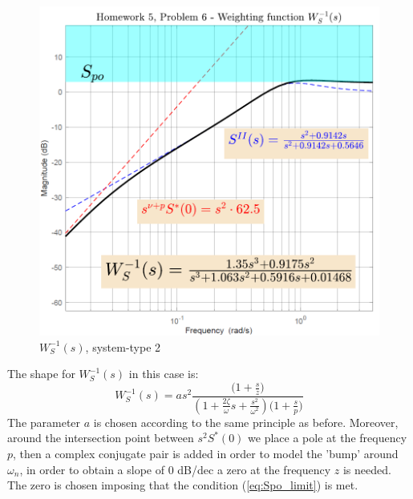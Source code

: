 \documentclass[a4paper, 12pt]{article}
\begin{document}
    \begin{figure}[h]\label{fig: type2_2}
        \centering
        \includegraphics[scale=0.8]{img/Ws_type2_2.png}
        \caption{$W_S^{-1}(s)$, system-type 2}
    \end{figure}

    \noindent
    The shape for $W_S^{-1}(s)$ in this case is:
    {\large{
        \begin{equation}
            W_S^{-1}(s) = a{s^{2}} \frac{
                \bigl(1+\frac{s}{z}\bigr)
            }
            {
                {(1+\frac{2\zeta}{\omega}s+\frac{s^2}{\omega^2})}
                {\bigl(1+\frac{s}{p}\bigr)}
            }
        \end{equation}
    }}
    The parameter $a$ is chosen according to the same principle as before. Moreover, around the intersection point between $s^2{S^*(0)}$ we place a pole at the frequency $p$, then a complex conjugate pair is added in order to model the 'bump' around $\omega_n$, in order to obtain a slope of 0 dB/dec a zero at the frequency $z$ is needed. The zero is chosen imposing that the condition (\ref{eq:Spo_limit}) is met.
    
\end{document}
